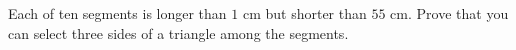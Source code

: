 Each of ten segments is longer than $1$ cm but shorter than $55$ cm. Prove that you can select three sides of a triangle among the segments.
